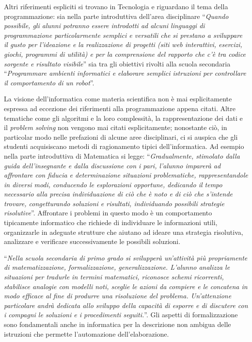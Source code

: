 \documentclass[12pt]{report}
\begin{document}
Altri riferimenti espliciti si trovano in Tecnologia e riguardano il tema della programmazione: sia nella parte introduttiva dell'area disciplinare ``\textit{Quando possibile, gli alunni potranno essere introdotti ad alcuni linguaggi di programmazione particolarmente semplici e versatili che si prestano a sviluppare il gusto per l’ideazione e la realizzazione di progetti (siti web interattivi, esercizi, giochi, programmi di utilità) e per la comprensione del rapporto che c’è tra codice sorgente e risultato visibile}'' sia tra gli obiettivi rivolti alla scuola secondaria ``\textit{Programmare ambienti informatici e elaborare semplici istruzioni per controllare il comportamento di un robot}''.

La visione dell'informatica come materia scientifica non è mai esplicitamente espressa ad eccezione dei riferimenti alla programmazione appena citati. Altre tematiche come gli algoritmi e la loro complessità, la rappresentazione dei dati e il \textit{problem solving} non vengono mai citati esplicitamente; nonostante ciò, in particolar modo nelle prefazioni di alcune aree disciplinari, ci si auspica che gli studenti acquisiscano metodi di ragionamento tipici dell'informatica. 
Ad esempio nella parte introduttiva di Matematica si legge: ``\textit{Gradualmente, stimolato dalla guida dell'insegnante e dalla discussione con i pari, l’alunno imparerà ad affrontare con fiducia e determinazione situazioni problematiche, rappresentandole in diversi modi, conducendo le esplorazioni opportune, dedicando il tempo necessario alla precisa individuazione di ciò che è noto e di ciò che s’intende trovare, congetturando soluzioni e risultati, individuando possibili strategie risolutive}''.
Affrontare i problemi in questo modo è un comportamento tipicamente informatico che richiede di individuare le informazioni utili, organizzarle in adeguate strutture che aiutano ad ideare una strategia risolutiva, analizzare e verificare successivamente le possibili soluzioni. 


``\textit{Nella scuola secondaria di primo grado si svilupperà un’attività più propriamente di matematizzazione, formalizzazione, generalizzazione. L’alunno analizza le situazioni per tradurle in termini matematici, riconosce schemi ricorrenti, stabilisce analogie con modelli noti, sceglie le azioni da compiere e le concatena in modo efficace al fine di produrre una risoluzione del problema. Un’attenzione particolare andrà dedicata allo sviluppo della capacità di esporre e di discutere con i compagni le soluzioni e i procedimenti seguiti.}''. 
Gli aspetti di formalizzazione sono fondamentali anche in informatica per la descrizione non ambigua delle istruzioni che permette l'automazione dell'elaborazione.
\end{document}
